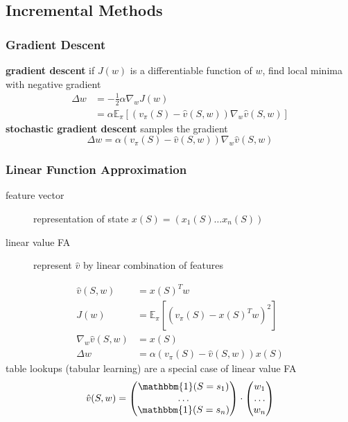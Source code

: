 \documentclass[]{article}
\theoremstyle{definition}
\newcommand{\E}{\mathbb{E}}
\newcommand{\ind}{\mathbbm{1}}
\begin{document}
\subsection{Incremental Methods}%
\label{sub:_incremental_methods}

\subsubsection{Gradient Descent}%
\label{ssub:gradient_descent}

\textbf{gradient descent} if $J(w)$ is a differentiable function of $w$, find local minima with negative gradient
\begin{align*}
    \Delta w &= - \frac{1}{2} \alpha \nabla_w J(w) \\
             &= \alpha \E_\pi[(v_\pi(S) - \hat v(S,w)) \nabla_w \hat v(S,w)]
\end{align*}
\textbf{stochastic gradient descent} samples the gradient
\begin{equation*}
    \Delta w = \alpha (v_\pi(S) - \hat v(S,w)) \nabla_w \hat v(S,w)
\end{equation*}

\subsubsection{Linear Function Approximation}%
\label{ssub:linear_function_approximation}

\begin{description}
    \item[feature vector] representation of state $x(S) = (x_1(S) \ldots x_n(S))$
    \item[linear value FA] represent $\hat v$ by linear combination of features
\end{description}
\begin{align*}
    \hat v (S, w) &= x(S)^Tw \\
    J(w) &= \E_\pi[(v_\pi(S) - x(S)^Tw)^2] \\
    \nabla_w \hat v(S,w) &= x(S) \\
    \Delta w &= \alpha(v_\pi(S) - \hat v(S,w)) x(S)
\end{align*}
table lookups (tabular learning) are a special case of linear value FA
\begin{align*}
    \hat v(S,w) =
    \begin{pmatrix}
        \ind(S = s_1) \\
        \ldots \\
        \ind(S = s_n)
    \end{pmatrix} \cdot
    \begin{pmatrix}
       w_1 \\
       \ldots \\
       w_n
    \end{pmatrix}
\end{align*}
\end{document}
